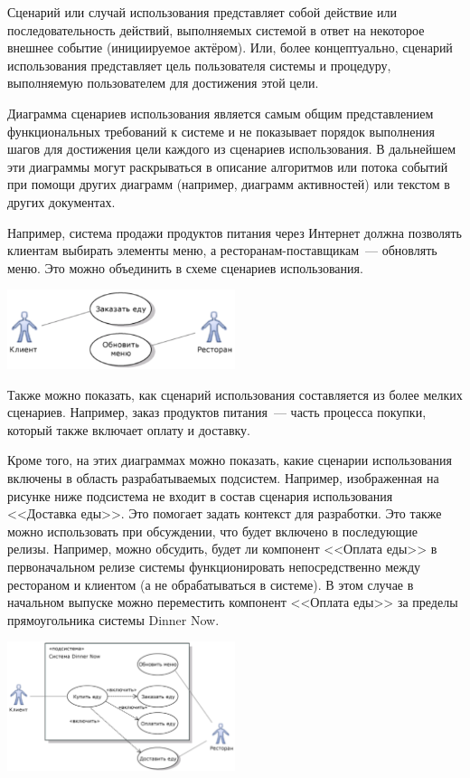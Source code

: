\documentclass{../../text-style}
\begin{document}
Сценарий или случай использования представляет собой действие или последовательность действий, выполняемых системой в ответ на некоторое внешнее событие (инициируемое актёром). Или, более концептуально, сценарий использования представляет цель пользователя системы и процедуру, выполняемую пользователем для достижения этой цели.

Диаграмма сценариев использования является самым общим представлением функциональных требований к системе и не показывает порядок выполнения шагов для достижения цели каждого из сценариев использования. В дальнейшем эти диаграммы могут раскрываться в описание алгоритмов или потока событий при помощи других диаграмм (например, диаграмм активностей) или текстом в других документах.

Например, система продажи продуктов питания через Интернет должна позволять клиентам выбирать элементы меню, а ресторанам-поставщикам~--- обновлять меню. Это можно объединить в схеме сценариев использования.

\begin{center}
    \includegraphics[width=0.5\textwidth]{useCaseSmallExample.png}
\end{center}

Также можно показать, как сценарий использования составляется из более мелких сценариев. Например, заказ продуктов питания~--- часть процесса покупки, который также включает оплату и доставку.

Кроме того, на этих диаграммах можно показать, какие сценарии использования включены в область разрабатываемых подсистем. Например, изображенная на рисунке ниже подсистема не входит в состав сценария использования <<Доставка еды>>. Это помогает задать контекст для разработки. Это также можно использовать при обсуждении, что будет включено в последующие релизы. Например, можно обсудить, будет ли компонент <<Оплата еды>> в первоначальном релизе системы функционировать непосредственно между рестораном и клиентом (а не обрабатываться в системе). В этом случае в начальном выпуске можно переместить компонент <<Оплата еды>> за пределы прямоугольника системы Dinner Now.

\begin{center}
    \includegraphics[width=0.5\textwidth]{useCaseBiggerExample.png}
\end{center}
\end{document}
